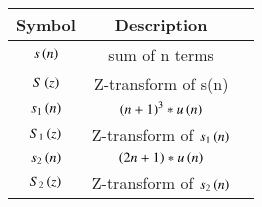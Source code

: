 \begin{tabular}{|c|c|c|}
    \hline
    	\textbf{Symbol} & \textbf{Description} \\
    \hline
	  $s\left(n\right)$ & sum of n terms \\
    \hline
	  $S\left(z\right)$ & Z-transform of s(n)\\
    \hline
	  $s_1\left(n\right)$ & $\left(n+1\right)^{3} * u\left(n\right)$\\
    \hline	  
	  $S_1\left(z\right)$ & Z-transform of $s_1\left(n\right)$\\
    \hline 
	  $s_2\left(n\right)$ & $\left(2n+1\right) * u\left(n\right)$\\
    \hline 
	  $S_2\left(z\right)$ & Z-transform of $s_2\left(n\right)$\\
    \hline
\end{tabular}
